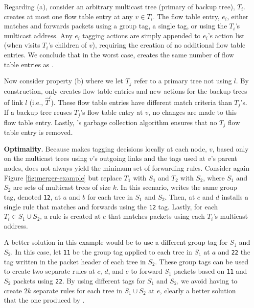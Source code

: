 Regarding (a), consider an arbitrary multicast tree (primary of backup tree), $T_i$. \merge creates at most one flow table entry at any $v \in T_i$.  
The flow table entry, $e_i$, either matches and forwards packets using a group tag, a single tag, or using the $T_i$'s multicast address.  Any $e_i$ tagging actions 
are simply appended to $e_i$'s action list (when \merge visits $T_i$'s children of $v$), requiring the creation of no additional flow table entries.  We conclude that in the worst case,
\merge creates the same number of flow table entries as \bases.  

Now consider property (b) where we let $T_j$ refer to a primary tree not using $l$. By construction, \merge only creates flow table entries and new actions for the backup trees of 
link $l$ (i.e., $\hat{T}^l$). These flow table entries have different match criteria than $T_j$'s.  If a backup tree reuses $T_j$'s flow table entry at $v$, 
no changes are made to this flow table entry.  Lastly, \mdrs's garbage collection algorithm ensures that no $T_j$ flow table entry is removed.



{\bf Optimality}.  
Because \merge makes tagging decisions locally at each node, $v$, based only on the multicast trees using $v$'s outgoing links and the tags used at $v$'s parent nodes,
\merge does not always yield the minimum set of forwarding rules.
Consider again Figure \ref{fig:merger-example} but replace $T_1$ with $S_1$ and $T_2$ with $S_2$, where $S_1$ and $S_2$ are sets of multicast trees of size $k$.
In this scenario, \merge writes the same group tag, denoted {\tt 12}, at $a$ and $b$ for each tree in $S_1$ and $S_2$.  Then, at $c$ and $d$ \merge installs a single rule that matches and forwards 
using the {\tt 12} tag.  Lastly, for each $T_i \in S_1 \cup S_2$, a rule is created at $e$ that matches packets using each $T_i$'s multicast address.  %

A better solution in this example would be to use a different group tag for $S_1$ and $S_2$.  In this case, let {\tt 11} be the group tag applied to each tree in $S_1$ 
at $a$ and {\tt 22} the tag written
in the packet header of each tree in $S_2$.  These group tags can be used to create two separate rules at $c$, $d$, and $e$ to forward $S_1$ packets based on {\tt 11} and $S_2$ packets using {\tt 22}.
By using different tags for $S_1$ and $S_2$, we avoid having to create $2k$ separate rules for each tree in $S_1 \cup S_2$ at $e$, clearly a better solution that the 
one produced by \merges. 


